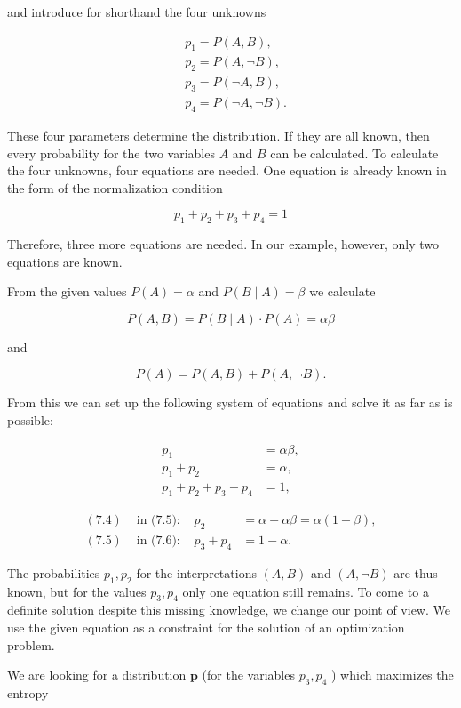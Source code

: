 \documentclass[10pt]{article}
\begin{document}
and introduce for shorthand the four unknowns

$$
\begin{aligned}
& p_{1}=P(A, B), \\
& p_{2}=P(A, \neg B), \\
& p_{3}=P(\neg A, B), \\
& p_{4}=P(\neg A, \neg B) .
\end{aligned}
$$

These four parameters determine the distribution. If they are all known, then every probability for the two variables $A$ and $B$ can be calculated. To calculate the four unknowns, four equations are needed. One equation is already known in the form of the normalization condition

$$
p_{1}+p_{2}+p_{3}+p_{4}=1
$$

Therefore, three more equations are needed. In our example, however, only two equations are known.

From the given values $P(A)=\alpha$ and $P(B \mid A)=\beta$ we calculate

$$
P(A, B)=P(B \mid A) \cdot P(A)=\alpha \beta
$$

and

$$
P(A)=P(A, B)+P(A, \neg B) .
$$

From this we can set up the following system of equations and solve it as far as is possible:


\begin{align*}
p_{1} & =\alpha \beta,  \tag{7.4}\\
p_{1}+p_{2} & =\alpha,  \tag{7.5}\\
p_{1}+p_{2}+p_{3}+p_{4} & =1, \tag{7.6}
\end{align*}



\begin{align*}
(7.4) & \text { in (7.5): } & p_{2} & =\alpha-\alpha \beta=\alpha(1-\beta),  \tag{7.7}\\
(7.5) & \text { in (7.6): } & p_{3}+p_{4} & =1-\alpha . \tag{7.8}
\end{align*}


The probabilities $p_{1}, p_{2}$ for the interpretations $(A, B)$ and $(A, \neg B)$ are thus known, but for the values $p_{3}, p_{4}$ only one equation still remains. To come to a definite solution despite this missing knowledge, we change our point of view. We use the given equation as a constraint for the solution of an optimization problem.

We are looking for a distribution $\boldsymbol{p}$ (for the variables $p_{3}, p_{4}$ ) which maximizes the entropy
\end{document}

